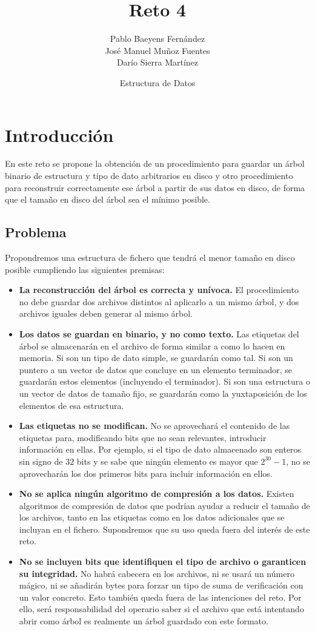 \documentclass{article}
\title{Reto 4}
\date{Estructura de Datos}
\author{Pablo Baeyens Fernández\\José Manuel Muñoz Fuentes\\Darío Sierra Martínez}
\begin{document}
\maketitle

\section{Introducción}

En este reto se propone la obtención de un procedimiento para guardar un árbol
binario de estructura y tipo de dato arbitrarios en disco y otro procedimiento
para reconstruir correctamente ese árbol a partir de sus datos en disco, de forma
que el tamaño en disco del árbol sea el mínimo posible. \\

\subsection{Problema}

Propondremos una estructura de fichero que tendrá el menor tamaño en disco
posible cumpliendo las siguientes premisas:
\begin{itemize}
	\item \textbf{La reconstrucción del árbol es correcta y unívoca.}
  El procedimiento no debe guardar dos archivos distintos al aplicarlo a un mismo
  árbol, y dos archivos iguales deben generar al mismo árbol.
	\item \textbf{Los datos se guardan en binario, y no como texto.} Las etiquetas
  del árbol se almacenarán en el archivo de forma similar a como lo hacen en
  memoria. Si son un tipo de dato simple, se guardarán como tal. Si son un puntero
  a un vector de datos que concluye en un elemento terminador, se guardarán estos
  elementos (incluyendo el terminador). Si son una estructura o un vector de datos
  de tamaño fijo, se guardarán como la yuxtaposición de los elementos de esa
  estructura.
	\item \textbf{Las etiquetas no se modifican.} No se aprovechará el contenido
  de las etiquetas para, modificando bits que no sean relevantes, introducir
  información en ellas. Por ejemplo, si el tipo de dato almacenado son enteros
  sin signo de $32$ bits y se sabe que ningún elemento es mayor que $2^{30}-1$,
  no se aprovecharán los dos primeros bits para incluir información en ellos.
	\item \textbf{No se aplica ningún algoritmo de compresión a los datos.}
  Existen algoritmos de compresión de datos que podrían ayudar a reducir el
  tamaño de los archivos, tanto en las etiquetas como en los datos adicionales
  que se incluyan en el fichero. Supondremos que su uso queda fuera del interés
  de este reto.
	\item \textbf{No se incluyen bits que identifiquen el tipo de archivo
  o garanticen su integridad.} No habrá cabecera en los archivos, ni se usará un
  número mágico, ni se añadirán bytes para forzar un tipo de suma de verificación
  con un valor concreto. Esto también queda fuera de las intenciones del reto.
  Por ello, será responsabilidad del operario saber si el archivo que está
  intentando abrir como árbol es realmente un árbol guardado con este formato.
\end{itemize}
\end{document}
